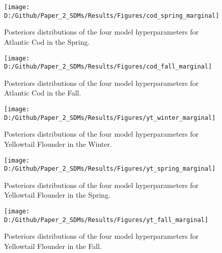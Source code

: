 \documentclass[
]{article}
\begin{document}
\clearpage

\begin{figure}
\texttt{[image: D:/Github/Paper\_2\_SDMs/Results/Figures/cod\_spring\_marginal]} \caption{Posteriors distributions of the four model hyperparameters for Atlantic Cod in the Spring.}\label{fig:hyper-cod-spring-post}
\end{figure}

\clearpage

\begin{figure}
\texttt{[image: D:/Github/Paper\_2\_SDMs/Results/Figures/cod\_fall\_marginal]} \caption{Posteriors distributions of the four model hyperparameters for Atlantic Cod  in the Fall.}\label{fig:hyper-cod-fall-post}
\end{figure}

\clearpage

\begin{figure}
\texttt{[image: D:/Github/Paper\_2\_SDMs/Results/Figures/yt\_winter\_marginal]} \caption{Posteriors distributions of the four model hyperparameters for Yellowtail Flounder in the Winter.}\label{fig:hyper-yt-winter-post}
\end{figure}

\clearpage

\begin{figure}
\texttt{[image: D:/Github/Paper\_2\_SDMs/Results/Figures/yt\_spring\_marginal]} \caption{Posteriors distributions of the four model hyperparameters for Yellowtail Flounder in the Spring.}\label{fig:hyper-yt-spring-post}
\end{figure}

\clearpage

\begin{figure}
\texttt{[image: D:/Github/Paper\_2\_SDMs/Results/Figures/yt\_fall\_marginal]} \caption{Posteriors distributions of the four model hyperparameters for Yellowtail Flounder in the Fall.}\label{fig:hyper-yt-fall-post}
\end{figure}

\clearpage
\end{document}
